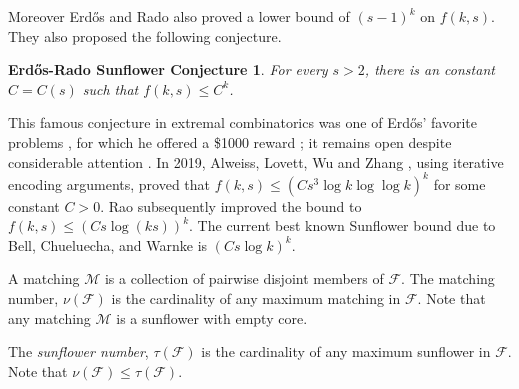 \documentclass[runningheads,12pt,a4paper]{article}
\newtheorem*{sunconj}{Erd\H{o}s-Rado Sunflower Conjecture}
\begin{document}
	Moreover Erd\H{o}s and Rado \cite{erdosrado1960} also proved a lower bound of $(s-1)^k$ on $f(k,s)$. They also proposed the following conjecture.
	
	\begin{sunconj}\label{sunconj}
		For every $s >2$, there is an constant $C=C(s)$ such that
		$f(k,s) \leq C^k$.
	\end{sunconj}
	This famous conjecture in extremal combinatorics
	was one of Erd\H{o}s’ favorite problems \cite{erdos1981}, for which he offered a \$1000 reward \cite{erdos1990}; it remains open despite
	considerable attention \cite{kostochka2000}.
	In 2019, Alweiss, Lovett, Wu and Zhang \cite{alweiss2020}, using iterative encoding arguments, proved that $f(k,s) 
	\leq (Cs^3\log k \log\log k)^k$ for some constant $C>0$.
	Rao \cite{rao2020} subsequently improved the bound to $f(k,s) \leq (Cs\log (ks))^k$. The current best known Sunflower bound
	due to Bell, Chueluecha, and Warnke \cite{Bell2021} is $(Cs\log k)^k$.
	
	
	A matching $\mathcal{M}$ is a collection of pairwise disjoint members of $\mathcal{F}$. The matching number,
	$\nu(\mathcal{F})$ is the cardinality of any maximum matching in $\mathcal{F}$. Note that any matching $\mathcal{M}$ is a sunflower with empty core.
	
	The \emph{sunflower number},
	$\tau(\mathcal{F})$ is the cardinality of any maximum sunflower in $\mathcal{F}$. Note that 
	$\nu(\mathcal{F}) \leq \tau(\mathcal{F})$.
	
\end{document}
